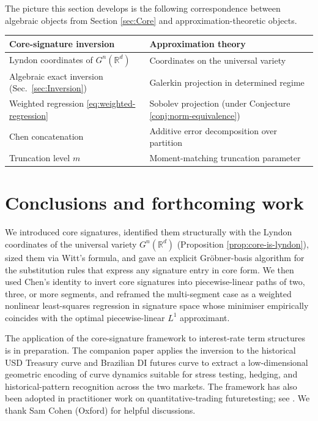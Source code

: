 \documentclass[11pt,english]{article}
\providecommand{\tabularnewline}{\\}
\begin{document}
The picture this section develops is the following correspondence
between algebraic objects from Section \ref{sec:Core} and approximation-theoretic
objects.

\begin{center}
\begin{tabular}{|l|l|}
\hline
Core-signature inversion & Approximation theory\tabularnewline
\hline\hline
Lyndon coordinates of $G^{n}(\mathbb{R}^{d})$ & Coordinates on the universal variety\tabularnewline\hline
Algebraic exact inversion (Sec.\ \ref{sec:Inversion}) & Galerkin projection in determined regime\tabularnewline\hline
Weighted regression \eqref{eq:weighted-regression} & Sobolev projection (under Conjecture \ref{conj:norm-equivalence})\tabularnewline\hline
Chen concatenation & Additive error decomposition over partition\tabularnewline\hline
Truncation level $m$ & Moment-matching truncation parameter\tabularnewline\hline
\end{tabular}
\par\end{center}

\section{Conclusions and forthcoming work}

We introduced core signatures, identified them structurally with the
Lyndon coordinates of the universal variety $G^{n}(\mathbb{R}^{d})$
(Proposition \ref{prop:core-is-lyndon}), sized them via Witt's formula,
and gave an explicit Gröbner-basis algorithm for the substitution
rules that express any signature entry in core form. We then used
Chen's identity to invert core signatures into piecewise-linear paths
of two, three, or more segments, and reframed the multi-segment case
as a weighted nonlinear least-squares regression in signature space
whose minimiser empirically coincides with the optimal piecewise-linear
$L^{1}$ approximant.

The application of the core-signature framework to interest-rate term
structures is in preparation. The companion paper applies the inversion
to the historical USD Treasury curve and Brazilian DI futures curve
to extract a low-dimensional geometric encoding of curve dynamics
suitable for stress testing, hedging, and historical-pattern recognition
across the two markets. The framework has also been adopted in practitioner
work on quantitative-trading futuretesting; see \cite{bloch_futuretesting}.
We thank Sam Cohen (Oxford) for helpful discussions.
\end{document}
